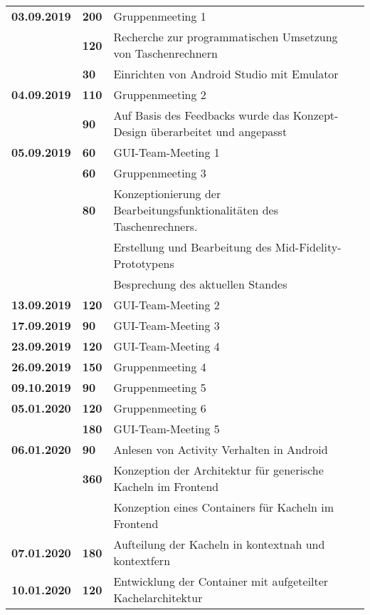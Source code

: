 {\begin{longtable}{|l|l|p{11cm}|}
		\textbf{03.09.2019} 
			& \textbf{\hfill 200} & Gruppenmeeting 1 \\\cline{2-3}
			& \textbf{\hfill 120} & Recherche zur programmatischen Umsetzung von Taschenrechnern \\\cline{2-3}
			& \textbf{\hfill 30} & Einrichten von Android Studio mit Emulator
		\\	
		\hline \textbf{04.09.2019}
			& \textbf{\hfill 110} & Gruppenmeeting 2 \\\cline{2-3}
			& \textbf{\hfill 90} & Auf Basis des Feedbacks wurde das Konzept-Design überarbeitet und angepasst
		\\	
		\hline \textbf{05.09.2019}
			& \textbf{\hfill 60} & GUI-Team-Meeting 1 \\\cline{2-3}
			& \textbf{\hfill 60} & Gruppenmeeting 3 \\
			& \textbf{\hfill 80} & Konzeptionierung der Bearbeitungsfunktionalitäten des Taschenrechners. \\
			& & Erstellung und Bearbeitung des Mid-Fidelity-Prototypens \\
			& & Besprechung des aktuellen Standes
		\\	
		\hline \textbf{13.09.2019}
			& \textbf{\hfill 120} & GUI-Team-Meeting 2
		\\	
		\hline \textbf{17.09.2019}
			& \textbf{\hfill 90} & GUI-Team-Meeting 3
		\\	
		\hline \textbf{23.09.2019}
			& \textbf{\hfill 120} & GUI-Team-Meeting 4
		\\	
		\hline \textbf{26.09.2019}
			& \textbf{\hfill 150} & Gruppenmeeting 4
		\\			
		\hline \textbf{09.10.2019}
			& \textbf{\hfill 90} & Gruppenmeeting 5
		\\	
		\hline \textbf{05.01.2020}
			& \textbf{\hfill 120} & Gruppenmeeting 6 \\\cline{2-3}
			& \textbf{\hfill 180} & GUI-Team-Meeting 5
		\\	
		\hline \textbf{06.01.2020}
			& \textbf{\hfill 90} & Anlesen von Activity Verhalten in Android \\\cline{2-3}
			& \textbf{\hfill 360} & Konzeption der Architektur für generische Kacheln im Frontend \\
			& & Konzeption eines Containers für Kacheln im Frontend
		\\	
		\hline \textbf{07.01.2020}
			& \textbf{\hfill 180} & Aufteilung der Kacheln in kontextnah und kontextfern
		\\	
		\hline \textbf{10.01.2020}
			& \textbf{\hfill 120} & Entwicklung der Container mit aufgeteilter Kachelarchitektur \\

\end{longtable}}
